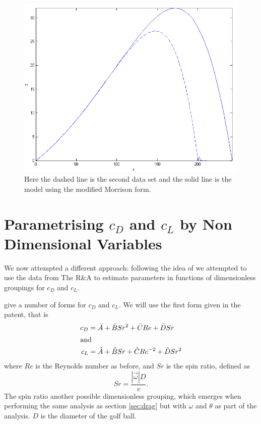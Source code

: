 \begin{figure}
\centering
\includegraphics[scale=0.8]{../images/data2-2d.png}
\caption[Second data set using the modified Morrison form.]{Here the dashed line is the second data
set and the solid line is the model using the modified Morrison form.}
\label{data2-2d}
\end{figure}

\section{Parametrising $c_{D}$ and $c_{L}$ by Non Dimensional Variables}

We now attempted a different approach: following the idea of \citet{Lieberman2001} we attempted to
use the data from The R\&A to estimate parameters in functions of dimensionless groupings for $c_D$
and $c_L$. 

\citet{Lieberman2001} give a number of forms for $c_D$ and $c_L$. We will use the first form given in
the patent, that is
\begin{subequations}
\begin{align}
c_D &= \bar{A} + \bar{B} Sr^2 + \bar{C} Re + \bar{D} Sr \\
\shortintertext{and}
c_L &= \hat{A} + \hat{B} Sr + \hat{C} Re^{-2} + \hat{D} Sr^2
\end{align}
\end{subequations}
where $Re$ is the Reynolds number as before, and $Sr$ is the spin ratio, defined as
\begin{equation}
Sr = \frac{|\vec{\omega}|D}{v} .
\end{equation}
The spin ratio another possible dimensionless grouping, which emerges when performing the same analysis
as section \ref{sec:drag} but with $\omega$ and $\theta$ as part of the analysis. $D$ is the diameter
of the golf ball.

